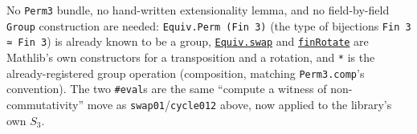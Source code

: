 No \texttt{Perm3} bundle, no hand-written extensionality lemma, and no field-by-field \texttt{Group} construction are needed: \texttt{Equiv.Perm (Fin 3)} (the type of bijections \texttt{Fin 3 ≃ Fin 3}) is already known to be a group, \href{https://loogle.lean-lang.org/?q=Equiv.swap}{\texttt{Equiv.swap}} and \href{https://loogle.lean-lang.org/?q=finRotate}{\texttt{finRotate}} are Mathlib's own constructors for a transposition and a rotation, and \texttt{*} is the already-registered group operation (composition, matching \texttt{Perm3.comp}'s convention). The two \texttt{\#eval}s are the same ``compute a witness of non-commutativity'' move as \texttt{swap01}/\texttt{cycle012} above, now applied to the library's own \(S_3\).

